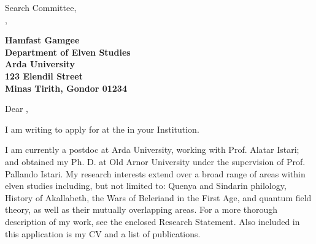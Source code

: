 \documentclass[11pt]{letter} %
\begin{document}

\begin{letter}{
Search Committee,\\
\group,\\
\institution}


\begin{center}
\large\bf Hamfast Gamgee \\ %
Department of Elven Studies \\
Arda University \\
123 Elendil Street \\
Minas Tirith, Gondor 01234
\end{center} 
\vfill

\signature{Hamfast Gamgee} %


\opening{Dear \people,}

I am writing to apply for {\position} at the {\group} in your Institution.


I am currently a postdoc at Arda University, working with Prof. Alatar Istari; and obtained my Ph. D. at Old Arnor University under the supervision of Prof. Pallando Istari. My research interests extend over a broad range of areas within elven studies including, but not limited to: Quenya and Sindarin philology, History of Akallabeth, the Wars of Beleriand in the First Age, and quantum field theory, as well as their mutually overlapping areas. For a more thorough description of my work, see the enclosed Research Statement. Also included in this application is my CV and a list of publications.


\end{letter}
\end{document}
